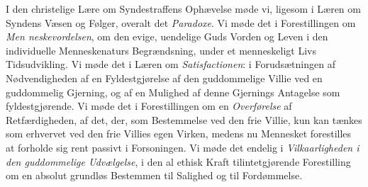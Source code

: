 I den christelige Lære om Syndestraffens Ophævelse møde vi, ligesom i Læren om
Syndens Væsen og Følger, overalt det \emph{Paradoxe}. Vi møde det i
Forestillingen om \emph{Men\-%
neskevordelsen}, om den evige, uendelige Guds Vorden og Leven i den individuelle
Menneskenaturs Begrændsning, under et menneskeligt Livs Tidsudvikling. Vi møde
det i Læren om \emph{Satisfactionen}: i Forudsætningen af Nødvendigheden af en
Fyldestgjørelse af den guddommelige Villie ved en guddommelig Gjerning, og af en
Mulighed af denne Gjernings Antagelse som fyldestgjørende. Vi møde det i
Forestillingen om en \emph{Overførelse} af Retfærdigheden, af det, der, som
Bestemmelse ved den frie Villie, kun kan tænkes som erhvervet ved den frie
Villies egen Virken, medens nu Mennesket forestilles at forholde sig rent
passivt i Forsoningen. Vi møde det endelig i \emph{Vilkaarligheden i den
guddommelige Udvælgelse}, i den al ethisk Kraft tilintetgjørende Forestilling om
en absolut grundløs Bestemmen til Salighed og til Fordømmelse.

